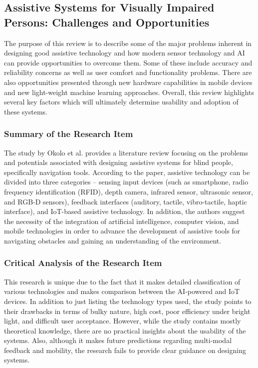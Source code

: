 \documentclass{FastFyp}
\begin{document}
\subsection{Assistive Systems for Visually Impaired Persons: Challenges and Opportunities}
The purpose of this review is to describe some of the major problems inherent in designing good assistive technology and how modern sensor technology and AI can provide opportunities to overcome them. Some of these include accuracy and reliability concerns as well as user comfort and functionality problems. There are also opportunities presented through new hardware capabilities in mobile devices and new light-weight machine learning approaches. Overall, this review highlights several key factors which will ultimately determine usability and adoption of these systems.

\subsubsection{Summary of the Research Item}  
The study by Okolo et al. \cite{ref:okolo2024assistive} provides a literature review focusing on the problems and potentials associated with designing assistive systems for blind people, specifically navigation tools. According to the paper, assistive technology can be divided into three categories – sensing input devices (such as smartphone, radio frequency identification (RFID), depth camera, infrared sensor, ultrasonic sensor, and RGB-D sensors), feedback interfaces (auditory, tactile, vibro-tactile, haptic interface), and IoT-based assistive technology. In addition, the authors suggest the necessity of the integration of artificial intelligence, computer vision, and mobile technologies in order to advance the development of assistive tools for navigating obstacles and gaining an understanding of the environment.

\subsubsection{Critical Analysis of the Research Item}  
This research is unique due to the fact that it makes detailed classification of various technologies and makes comparison between the AI-powered and IoT devices. In addition to just listing the technology types used, the study points to their drawbacks in terms of bulky nature, high cost, poor efficiency under bright light, and difficult user acceptance. However, while the study contains mostly theoretical knowledge, there are no practical insights about the usability of the systems. Also, although it makes future predictions regarding multi-modal feedback and mobility, the research fails to provide clear guidance on designing systems.
\end{document}
